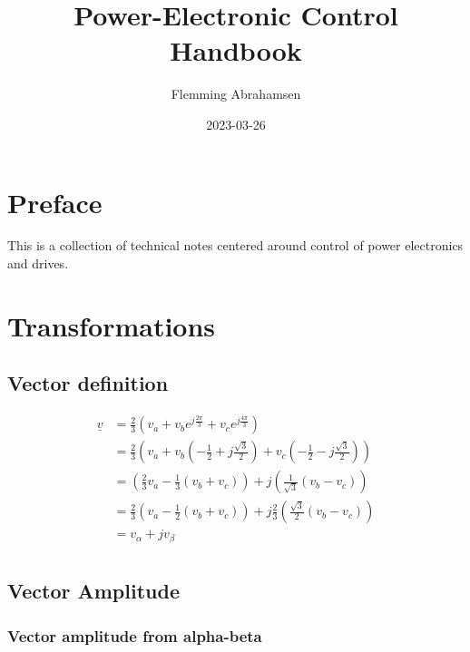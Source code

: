 \documentclass[]{book}
\title{Power-Electronic Control Handbook}
\author{Flemming Abrahamsen}
\date{2023-03-26}
\begin{document}
\maketitle

{
\setcounter{tocdepth}{1}
\tableofcontents
}
\hypertarget{preface}{%
\chapter{Preface}\label{preface}}

This is a collection of technical notes centered around control of power electronics and drives.

\hypertarget{transformations}{%
\chapter{Transformations}\label{transformations}}

\hypertarget{vector-definition}{%
\section{Vector definition}\label{vector-definition}}

\[
\begin{aligned}
\underline{v} 
& = \frac{2}{3} \left( v_a + v_b e^{j \frac{2 \pi}{3}}+ v_c e^{j \frac{4 \pi}{3}} \right)\\
& = \frac{2}{3} \left( v_a + v_b (- \frac{1}{2}+j\frac{\sqrt{3}}{2}) + v_c (- \frac{1}{2}-j\frac{\sqrt{3}}{2}) \right)\\
& = \left(\frac{2}{3} v_a - \frac{1}{3}  (v_b+v_c) \right) + j \left( \frac{1}{\sqrt{3}} (v_b-v_c) \right)   \\
& = \frac{2}{3} \left( v_a - \frac{1}{2}  (v_b+v_c) \right) + j \frac{2}{3} \left( \frac{\sqrt{3}}{2} (v_b-v_c) \right)   \\
& = v_\alpha + j v_\beta   \\
\end{aligned}
\label{eq:trans1}
\]

\hypertarget{vector-amplitude}{%
\section{Vector Amplitude}\label{vector-amplitude}}

\hypertarget{vector-amplitude-from-alpha-beta}{%
\subsection{Vector amplitude from alpha-beta}\label{vector-amplitude-from-alpha-beta}}
\end{document}
